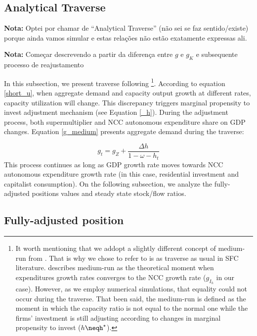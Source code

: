 \documentclass[11pt]{article}
\begin{document}
\subsection{Analytical Traverse}
\label{sec:orgbb3e8dd}

\textbf{Nota:} Optei por chamar de ``Analytical Traverse'' (não sei se faz sentido/existe) porque ainda vamos simular e estas relações não estão exatamente expressas ali.

\textbf{Nota:} Começar descrevendo a partir da diferença entre \(g\) e \(g_K\) e subsequente processo de reajustamento

In this subsection, we present traverse following \textcite{freitas_growth_2015}\footnote{It worth mentioning that we addopt a slightly different concept of medium-run from \textcite{freitas_growth_2015}. That is why we chose to refer to is as traverse as usual in SFC literature. \textcite{freitas_growth_2015} describes medium-run as the theoretical moment when expenditures growth rates converges to the NCC growth rate (\(g_{I_h}\) in our case). However, as we employ numerical simulations, that equality could not occur during the traverse. That been said, the medium-run is defined as the moment in which the capacity ratio is not equal to the normal one while the firms' investment is still adjusting according to changes in marginal propensity to invest (\(h\neqh^\star\)).}.
According to equation \ref{short_u}, when aggregate demand and capacity output growth at different rates, capacity utilization will change. 
This discrepancy triggers marginal propensity to invest adjustment mechanism (see Equation \ref{_h}). 
During the adjustment process, both supermultiplier and NCC autonomous expenditure share on GDP changes.
Equation \ref{g_medium} presents aggregate demand during the traverse:

\begin{equation}
\label{g_medium}
g_t = g_{Z} + \frac{\Delta h}{1 - \omega - h_{t}}
\end{equation}
This process continues as long as GDP growth rate moves towards NCC autonomous expenditure growth rate (in this case, residential investment and capitalist consumption). On the following subsection, we analyze the fully-adjusted positions values and steady state stock/flow ratios.


\subsection{Fully-adjusted position}
\label{sec:org1b0ccc1}
\label{long}
\end{document}
